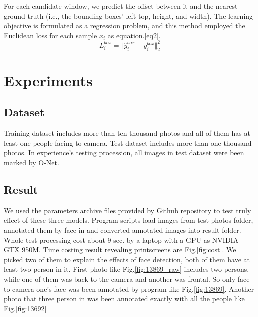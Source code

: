 \documentclass[journal, a4paper]{IEEEtran}
\begin{document}
For each candidate window, we  predict the offset between it and the nearest ground truth (i.e., the bounding boxes’ left top, height, and width). The learning objective is formulated as a regression problem, and this method employed the Euclidean loss for each sample $x_{i}$ as equation.\ref{eq2}.
\begin{equation}
    L_{i}^{box}=\Vert \hat{y}_{i}^{box}-y_{i}^{box} \Vert_2^{2} \label{eq2}
\end{equation}


\section{Experiments}
\subsection{Dataset}
Training dataset includes more than ten thousand photos and all of them has at least one people facing to camera. Test dataset includes more than one thousand photos. In experience's testing procession, all images in test dataset were been marked by O-Net.

\subsection{Result}
We used the parameters archive files provided by Github repository to test truly effect of these three models. Program scripts load images from test photos folder, annotated them by face in and converted annotated images into result folder. Whole test processing cost about 9 sec. by a laptop with a GPU as NVIDIA GTX 950M. Time costing result revealing printscreens are Fig.\ref{fig:cost}.  We picked two of them to explain the effects of face detection, both of them have at least two person in it. First photo like Fig.\ref{fig:13869_raw} includes two persons, while one of them was back to the camera and another was frontal. So only face-to-camera one's face was been annotated by program like Fig.\ref{fig:13869}. Another photo that three person in was been annotated exactly with all the people like Fig.\ref{fig:13692}

\end{document}
